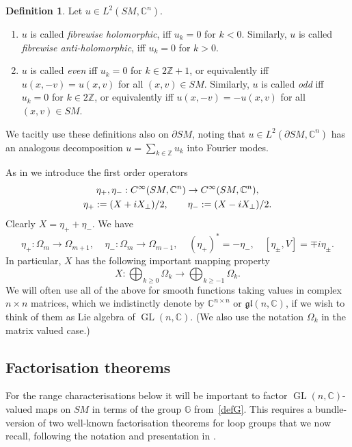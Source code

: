 \documentclass[JEP,XML,SOM,Unicode,published]{cedram}
\DeclareMathOperator{\GL}{GL}
\theoremstyle{plain}
\theoremstyle{definition}
\newtheorem{definition}[theorem]{Definition}
\newcommand{\G}{\mathbb{G}}
\newcommand{\Z}{\mathbb{Z}}
\newcommand{\C}{\mathbb{C}}
\newcommand{\gl}{\mathfrak{gl}}
\newcommand{\1}{{\bf 1}}
\begin{document}
\begin{definition} Let $u\in L^2(SM,\C^n)$.
\begin{enumerate}
\item $u$ is called \emph{fibrewise holomorphic}, iff $u_k=0$ for $k<0$. Similarly, $u$ is called \emph{fibrewise anti-holomorphic}, iff $u_k=0$ for $k>0$.
\item $u$ is called \emph{even} iff $u_k=0$ for $k\in 2\Z+1$, or equivalently iff $u(x,-v)=u(x,v)$ for all $(x,v)\in SM$. Similarly, $u$ is called \emph{odd} iff $u_k=0$ for $k\in 2\Z$, or equivalently iff $u(x,-v)=-u(x,v)$ for all $(x,v)\in SM$.
\end{enumerate}
\end{definition}

We tacitly use these definitions also on $\partial SM$, noting that $u\in L^2(\partial SM,\C^n)$ has an analogous decomposition $u=\sum_{k\in \Z}u_k$ into Fourier modes.

As in \cite{GK} we introduce the first order operators
\begin{gather}\label{defeta}
\eta_{+},\eta_{-}:C^{\infty}(SM,\C^n)\to
C^{\infty}(SM,\C^n),
\\
\eta_{+}:=(X+iX_{\perp})/2,\qquad\eta_{-}:=(X-iX_{\perp})/2.\notag
\end{gather}
Clearly $X=\eta_{+}+\eta_{-}$.
We have
\begin{equation*}\eta_{+}:\Omega_{m}\to \Omega_{m+1},\;\;\;\;\eta_{-}:\Omega_{m}\to \Omega_{m-1},\;\;\;\;(\eta_{+})^{*}=-\eta_{-},\quad [\eta_\pm,V]=\mp i\eta_\pm
.\end{equation*}
In particular, $X$ has the following important mapping property
\begin{equation*}X:\bigoplus_{k\geq 0}\Omega_{k}\to \bigoplus_{k\geq -1}\Omega_{k}.\end{equation*}
We will often use all of the above for smooth functions taking values in complex $n\times n$ matrices, which we indistinctly denote by $\C^{n\times n}$ or $\gl(n,\C)$, if we wish to think of them as Lie algebra of $\GL(n,\C)$. (We also use the notation $\Omega_k$ in the matrix valued case.)

\subsection{Factorisation theorems}\label{factorisation}

For the range characterisations below it will be important to factor $\GL(n,\C)$-valued maps on $SM$ in terms of the group $\G$ from~\eqref{defG}. This requires a bundle-version of two well-known
factorisation theorems for loop groups that we now recall, following the notation and presentation in \cite[\S 8]{PS86}.
\end{document}
